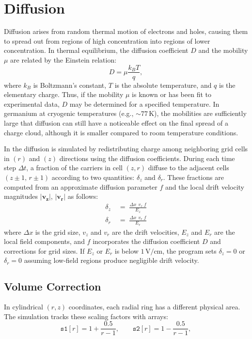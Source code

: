 \section{Diffusion}
Diffusion arises from random thermal motion of electrons and holes, causing them to spread out from regions of high concentration into regions of lower concentration. In thermal equilibrium, the diffusion coefficient $D$ and the mobility $\mu$
are related by the Einstein relation:
\begin{equation}
D = \mu \frac{k_B T}{q},
\end{equation}
where $k_B$ is Boltzmann's constant, $T$ is the absolute temperature, and $q$ is the elementary charge. Thus, if the mobility $\mu$ is known or has been fit to experimental data, $D$ may be determined for a specified temperature. In germanium at cryogenic temperatures (e.g., $\sim 77$\,K), the mobilities are
sufficiently large that diffusion can still have a noticeable effect on the final spread of a charge cloud, although it is smaller compared to room temperature conditions.


In {\ehd} the diffusion is simulated by redistributing charge among neighboring grid cells in $(r)$ and $(z)$ directions using the diffusion coefficients. During each time step $\Delta t$, a fraction of the carriers in cell $(z,r)$ diffuse to the adjacent cells $(z\pm1,\,r\pm1)$ according to two quantities: $\delta_z$ and $\delta_r$. These fractions are computed from an approximate diffusion parameter $f$ and the local drift velocity magnitudes $\lvert \mathbf{v_z} \rvert$, $\lvert \mathbf{v_r} \rvert$ as follows:
\begin{align}
   \delta_z &\;=\; \frac{\Delta x \;\,v_z \;f}{E_z}\label{eq:deltaez}\\
   \delta_r &\;=\; \frac{\Delta x \;\,v_r \;f}{E_r} \label{eq:deltaer}
\end{align}
where $\Delta x$ is the grid size, $v_{z}$ and $v_{r}$ are the drift velocities, $E_{z}$ and $E_{r}$ are the local field components, and $f$ incorporates the diffusion coefficient $D$ and corrections for grid sizes. If $E_z$ or $E_r$ is below $1\,\mathrm{V/cm}$, the program sets $\delta_z = 0$ or $\delta_r=0$ assuming low-field regions produce negligible drift velocity.

\subsection{Volume Correction}

In cylindrical $(r,z)$ coordinates, each radial ring has a different physical area. The simulation tracks these scaling factors with arrays:
\[
\texttt{s1}[r] = 1 + \frac{0.5}{r-1}, 
\qquad
\texttt{s2}[r] = 1 - \frac{0.5}{r-1},
\] 

